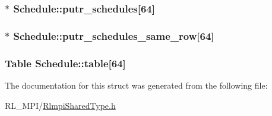 \label{structSchedule_ae51ae34867cdecb96111f9a3d986b7a4}
\hypertarget{structSchedule_ab02d40d54d5146c7ed92e7f689b26fd7}{
\subsubsection[{putr\_\-schedules}]{$\ast$ {\bf Schedule::putr\_\-schedules}\mbox{[}64\mbox{]}}}
\label{structSchedule_ab02d40d54d5146c7ed92e7f689b26fd7}
\hypertarget{structSchedule_a055c6e63ce07decd2b1b12c45ba567c3}{
\subsubsection[{putr\_\-schedules\_\-same\_\-row}]{$\ast$ {\bf Schedule::putr\_\-schedules\_\-same\_\-row}\mbox{[}64\mbox{]}}}
\label{structSchedule_a055c6e63ce07decd2b1b12c45ba567c3}
\hypertarget{structSchedule_a6e17381062491d811869a301a45352fd}{
\subsubsection[{table}]{\setlength{\rightskip}{0pt plus 5cm}Table {\bf Schedule::table}\mbox{[}64\mbox{]}}}
\label{structSchedule_a6e17381062491d811869a301a45352fd}


The documentation for this struct was generated from the following file:\begin{DoxyCompactItemize}
\item 
RL\_\-MPI/\hyperlink{RlmpiSharedType_8h}{RlmpiSharedType.h}\end{DoxyCompactItemize}
